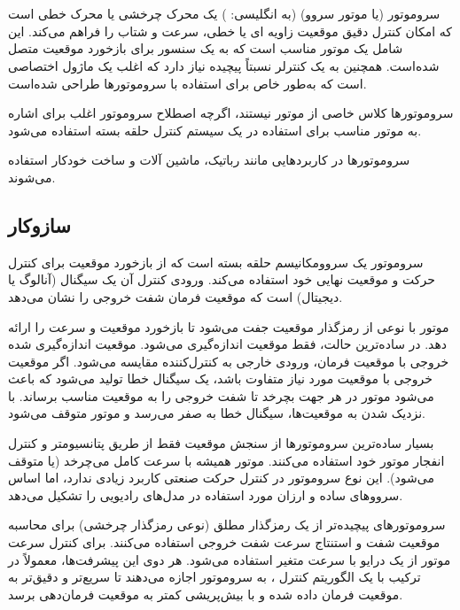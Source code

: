 \documentclass{article}
\begin{document}


\tableofcontents
\newpage

\section{}
سروموتور (یا موتور سروو) (به انگلیسی: ) یک محرک چرخشی یا محرک خطی است که امکان کنترل دقیق موقعیت زاویه ای یا خطی، سرعت و شتاب را فراهم می‌کند. این شامل یک موتور مناسب است که به یک سنسور برای بازخورد موقعیت متصل شده‌است. همچنین به یک کنترلر نسبتاً پیچیده نیاز دارد که اغلب یک ماژول اختصاصی است که به‌طور خاص برای استفاده با سروموتورها طراحی شده‌است.

سروموتورها کلاس خاصی از موتور نیستند، اگرچه اصطلاح سروموتور اغلب برای اشاره به موتور مناسب برای استفاده در یک سیستم کنترل حلقه بسته استفاده می‌شود.

سروموتورها در کاربردهایی مانند رباتیک، ماشین آلات  و ساخت خودکار استفاده می‌شوند.

\subsection{سازوکار}
سروموتور یک سروومکانیسم حلقه بسته است که از بازخورد موقعیت برای کنترل حرکت و موقعیت نهایی خود استفاده می‌کند. ورودی کنترل آن یک سیگنال (آنالوگ یا دیجیتال) است که موقعیت فرمان شفت خروجی را نشان می‌دهد.

موتور با نوعی از رمزگذار موقعیت جفت می‌شود تا بازخورد موقعیت و سرعت را ارائه دهد. در ساده‌ترین حالت، فقط موقعیت اندازه‌گیری می‌شود. موقعیت اندازه‌گیری شده خروجی با موقعیت فرمان، ورودی خارجی به کنترل‌کننده مقایسه می‌شود. اگر موقعیت خروجی با موقعیت مورد نیاز متفاوت باشد، یک سیگنال خطا تولید می‌شود که باعث می‌شود موتور در هر جهت بچرخد تا شفت خروجی را به موقعیت مناسب برساند. با نزدیک شدن به موقعیت‌ها، سیگنال خطا به صفر می‌رسد و موتور متوقف می‌شود.

بسیار ساده‌ترین سروموتورها از سنجش موقعیت فقط از طریق پتانسیومتر و کنترل انفجار موتور خود استفاده می‌کنند. موتور همیشه با سرعت کامل می‌چرخد (یا متوقف می‌شود). این نوع سروموتور در کنترل حرکت صنعتی کاربرد زیادی ندارد، اما اساس سرووهای ساده و ارزان مورد استفاده در مدل‌های رادیویی را تشکیل می‌دهد.

سروموتورهای پیچیده‌تر از یک رمزگذار مطلق (نوعی رمزگذار چرخشی) برای محاسبه موقعیت شفت و استنتاج سرعت شفت خروجی استفاده می‌کنند. برای کنترل سرعت موتور از یک درایو با سرعت متغیر استفاده می‌شود. هر دوی این پیشرفت‌ها، معمولاً در ترکیب با یک الگوریتم کنترل ، به سروموتور اجازه می‌دهند تا سریع‌تر و دقیق‌تر به موقعیت فرمان داده شده و با بیش‌پریشی کمتر به موقعیت فرمان‌دهی برسد.
\end{document}
